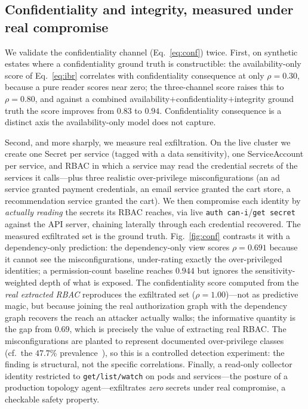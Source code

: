 \documentclass[conference]{IEEEtran}
\begin{document}
\subsection{Confidentiality and integrity, measured under real compromise}
\label{sec:ci-results}
\label{sec:real-conf}
We validate the confidentiality channel (Eq.~\eqref{eq:conf}) twice. First, on
synthetic estates where a confidentiality ground truth is constructible: the
availability-only score of Eq.~\eqref{eq:ibr} correlates with confidentiality
consequence at only $\rho=0.30$, because a pure reader scores near zero; the
three-channel score raises this to $\rho=0.80$, and against a combined
availability$+$confidentiality$+$integrity ground truth the score improves from
$0.83$ to $0.94$. Confidentiality consequence is a distinct axis the
availability-only model does not capture.

Second, and more sharply, we measure real exfiltration. On the live cluster we
create one Secret per service (tagged with a data sensitivity), one ServiceAccount
per service, and RBAC in which a service may read the credential secrets of the
services it calls---plus three realistic over-privilege misconfigurations (an ad
service granted payment credentials, an email service granted the cart store, a
recommendation service granted the cart). We then compromise each identity by
\emph{actually reading} the secrets its RBAC reaches, via live
\texttt{auth can-i}/\texttt{get secret} against the API server, chaining laterally
through each credential recovered. The measured exfiltrated set is the ground truth.
Fig.~\ref{fig:conf} contrasts it with a dependency-only prediction: the
dependency-only view scores $\rho=0.691$ because it cannot see the
misconfigurations, under-rating exactly the over-privileged identities; a
permission-count baseline reaches $0.944$ but ignores the sensitivity-weighted depth
of what is exposed. The confidentiality score computed from the \emph{real extracted
RBAC} reproduces the exfiltrated set ($\rho=1.00$)---not as predictive magic, but
because joining the real authorization graph with the dependency graph recovers the
reach an attacker actually walks; the informative quantity is the gap from $0.69$,
which is precisely the value of extracting real RBAC. The misconfigurations are planted to represent documented over-privilege classes
(cf.\ the $47.7\%$ prevalence~\cite{overpriv}), so this is a controlled detection
experiment: the finding is structural, not the specific correlations. Finally, a read-only collector
identity restricted to \texttt{get/list/watch} on pods and services---the posture of
a production topology agent---exfiltrates \emph{zero} secrets under real compromise,
a checkable safety property.
\end{document}
